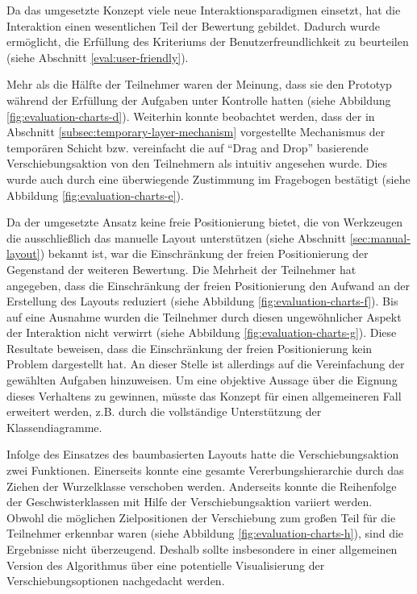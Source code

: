 Da das umgesetzte Konzept viele neue Interaktionsparadigmen einsetzt, hat die Interaktion einen wesentlichen Teil der Bewertung gebildet. Dadurch wurde ermöglicht, die Erfüllung des Kriteriums der Benutzerfreundlichkeit zu beurteilen (siehe Abschnitt \ref{eval:user-friendly}).

Mehr als die Hälfte der Teilnehmer waren der Meinung, dass sie den Prototyp während der Erfüllung der Aufgaben unter Kontrolle hatten (siehe Abbildung \ref{fig:evaluation-charts-d}). Weiterhin konnte beobachtet werden, dass der in Abschnitt \ref{subsec:temporary-layer-mechanism} vorgestellte Mechanismus der temporären Schicht bzw. vereinfacht die auf \enquote{Drag and Drop} basierende Verschiebungsaktion von den Teilnehmern als intuitiv angesehen wurde. Dies wurde auch durch eine überwiegende Zustimmung im Fragebogen bestätigt (siehe Abbildung \ref{fig:evaluation-charts-e}).

Da der umgesetzte Ansatz keine freie Positionierung bietet, die von Werkzeugen die ausschließlich das manuelle Layout unterstützen (siehe Abschnitt \ref{sec:manual-layout}) bekannt ist, war die Einschränkung der freien Positionierung der Gegenstand der weiteren Bewertung. Die Mehrheit der Teilnehmer hat angegeben, dass die Einschränkung der freien Positionierung den Aufwand an der Erstellung des Layouts reduziert (siehe Abbildung \ref{fig:evaluation-charts-f}). Bis auf eine Ausnahme wurden die Teilnehmer durch diesen ungewöhnlicher Aspekt der Interaktion nicht verwirrt (siehe Abbildung \ref{fig:evaluation-charts-g}). Diese Resultate beweisen, dass die Einschränkung der freien Positionierung kein Problem dargestellt hat. An dieser Stelle ist allerdings auf die Vereinfachung der gewählten Aufgaben hinzuweisen. Um eine objektive Aussage über die Eignung dieses Verhaltens zu gewinnen, müsste das Konzept für einen allgemeineren Fall erweitert werden, z.B. durch die vollständige Unterstützung der Klassendiagramme.

Infolge des Einsatzes des baumbasierten Layouts hatte die Verschiebungsaktion zwei Funktionen. Einerseits konnte eine gesamte Vererbungshierarchie durch das Ziehen der Wurzelklasse verschoben werden. Anderseits konnte die Reihenfolge der Geschwisterklassen mit Hilfe der Verschiebungsaktion variiert werden. Obwohl die möglichen Zielpositionen der Verschiebung zum großen Teil für die Teilnehmer erkennbar waren (siehe Abbildung \ref{fig:evaluation-charts-h}), sind die Ergebnisse nicht überzeugend. Deshalb sollte insbesondere in einer allgemeinen Version des Algorithmus über eine potentielle Visualisierung der Verschiebungsoptionen nachgedacht werden.

